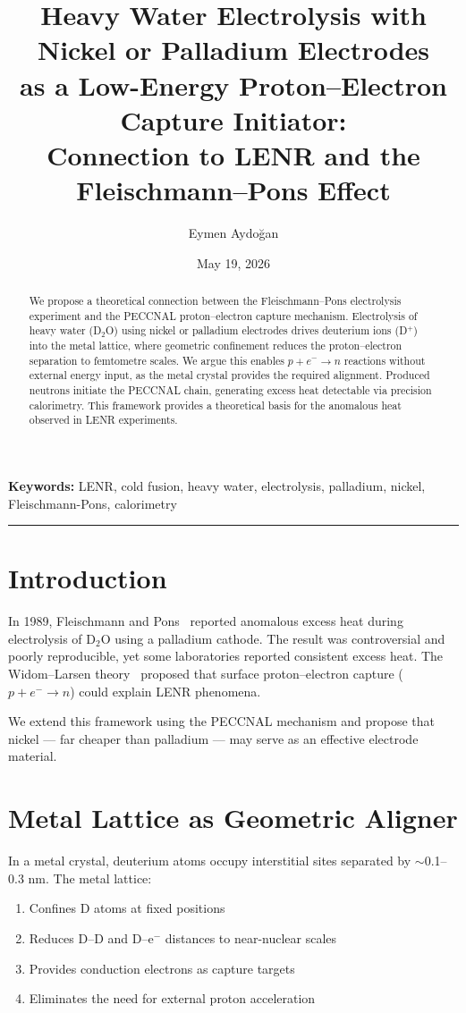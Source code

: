 \documentclass[12pt,a4paper]{article}
\title{\textbf{Heavy Water Electrolysis with Nickel or Palladium Electrodes\\
as a Low-Energy Proton--Electron Capture Initiator:\\
Connection to LENR and the Fleischmann--Pons Effect}}
\author{Eymen Aydoğan}
\date{May 19, 2026}
\begin{document}
\maketitle

\begin{abstract}
We propose a theoretical connection between the Fleischmann--Pons
electrolysis experiment and the PECCNAL proton--electron capture
mechanism. Electrolysis of heavy water (D$_2$O) using nickel or
palladium electrodes drives deuterium ions (D$^+$) into the metal
lattice, where geometric confinement reduces the proton--electron
separation to femtometre scales. We argue this enables
$p + e^- \rightarrow n$ reactions without external energy input,
as the metal crystal provides the required alignment. Produced
neutrons initiate the PECCNAL chain, generating excess heat
detectable via precision calorimetry. This framework provides
a theoretical basis for the anomalous heat observed in LENR
experiments.
\end{abstract}

\noindent\textbf{Keywords:} LENR, cold fusion, heavy water,
electrolysis, palladium, nickel, Fleischmann-Pons, calorimetry

\hrule\vspace{1em}

\section{Introduction}
In 1989, Fleischmann and Pons~\cite{fleischmann1989} reported
anomalous excess heat during electrolysis of D$_2$O using a
palladium cathode. The result was controversial and poorly
reproducible, yet some laboratories reported consistent excess
heat. The Widom--Larsen theory~\cite{widom2006} proposed that
surface proton--electron capture ($p + e^- \rightarrow n$) could
explain LENR phenomena.

We extend this framework using the PECCNAL mechanism and propose
that nickel — far cheaper than palladium — may serve as an
effective electrode material.

\section{Metal Lattice as Geometric Aligner}

In a metal crystal, deuterium atoms occupy interstitial sites
separated by $\sim$0.1--0.3 nm. The metal lattice:
\begin{enumerate}
\item Confines D atoms at fixed positions
\item Reduces D--D and D--e$^-$ distances to near-nuclear scales
\item Provides conduction electrons as capture targets
\item Eliminates the need for external proton acceleration
\end{enumerate}
\end{document}
